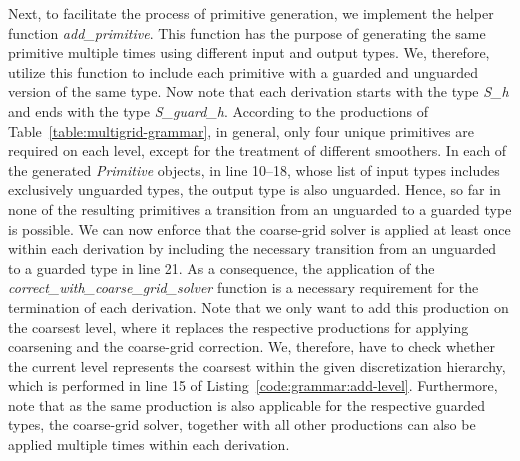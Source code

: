 Next, to facilitate the process of primitive generation, we implement the helper function \emph{add\_primitive}.
This function has the purpose of generating the same primitive multiple times using different input and output types. 
We, therefore, utilize this function to include each primitive with a guarded and unguarded version of the same type.
Now note that each derivation starts with the type \emph{S\_h} and ends with the type \emph{S\_guard\_h}.
According to the productions of Table~\ref{table:multigrid-grammar}, in general, only four unique primitives are required on each level, except for the treatment of different smoothers.
In each of the generated \emph{Primitive} objects, in line 10--18, whose list of input types includes exclusively unguarded types, the output type is also unguarded.
Hence, so far in none of the resulting primitives a transition from an unguarded to a guarded type is possible.
We can now enforce that the coarse-grid solver is applied at least once within each derivation by including the necessary transition from an unguarded to a guarded type in line 21.
As a consequence, the application of the \emph{correct\_with\_coarse\_grid\_solver} function is a necessary requirement for the termination of each derivation. 
Note that we only want to add this production on the coarsest level, where it replaces the respective productions for applying coarsening and the coarse-grid correction.
We, therefore, have to check whether the current level represents the coarsest within the given discretization hierarchy, which is performed in line 15 of Listing~\ref{code:grammar:add-level}.
Furthermore, note that as the same production is also applicable for the respective guarded types, the coarse-grid solver, together with all other productions can also be applied multiple times within each derivation.

